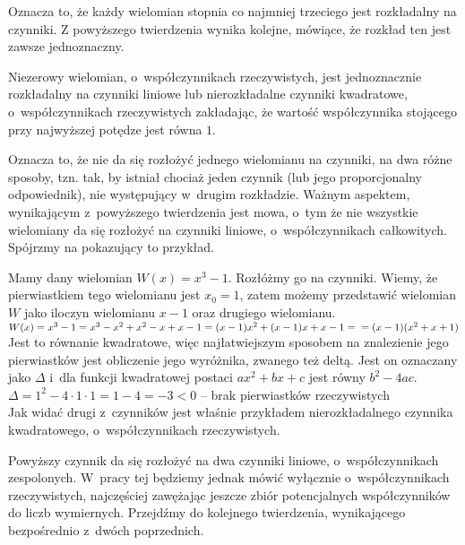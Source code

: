 Oznacza to, że każdy wielomian stopnia co najmniej trzeciego jest rozkładalny na czynniki. Z powyższego twierdzenia wynika kolejne, mówiące, że rozkład ten jest zawsze jednoznaczny.

\begin{theorem}
	$ $\\
	Niezerowy wielomian, o~współczynnikach rzeczywistych, jest jednoznacznie rozkładalny na czynniki liniowe lub nierozkładalne czynniki kwadratowe, o~współczynnikach rzeczywistych zakładając, że wartość współczynnika stojącego przy najwyższej potędze jest równa $1$.
\end{theorem}

Oznacza to, że nie da się rozłożyć jednego wielomianu na czynniki, na dwa różne sposoby, tzn. tak, by istniał chociaż jeden czynnik (lub jego proporcjonalny odpowiednik), nie występujący w~drugim rozkładzie. Ważnym aspektem, wynikającym z~powyższego twierdzenia jest mowa, o~tym że nie wszystkie wielomiany da się rozłożyć na czynniki liniowe, o~współczynnikach całkowitych. Spójrzmy na pokazujący to przykład.

\begin{example}
	$ $\\
	Mamy dany wielomian $W(x)=x^3-1$. Rozłóżmy go na czynniki.
	Wiemy, że pierwiastkiem tego wielomianu jest $x_0 = 1$, zatem możemy przedstawić wielomian $W$ jako iloczyn wielomianu $x-1$ oraz drugiego wielomianu. \\
	$W(x)=x^3-1=x^3-x^2+x^2-x+x-1=(x-1)x^2+(x-1)x+x-1 = \\
	=(x-1)(x^2+x+1)$ \\
	Jest to równanie kwadratowe, więc najłatwiejszym sposobem na znalezienie jego pierwiastków jest obliczenie jego wyróżnika, zwanego też deltą. Jest on oznaczany jako $\Delta$ i~dla funkcji kwadratowej postaci $ax^2+bx+c$ jest równy $b^2-4ac$. \\
	$\Delta = 1^2 - 4 \cdot 1 \cdot 1 = 1 - 4 = -3 < 0$ -- brak pierwiastków rzeczywistych\\
	Jak widać drugi z~czynników jest właśnie przykładem nierozkładalnego czynnika kwadratowego, o~współczynnikach rzeczywistych.
\end{example}

Powyższy czynnik da się rozłożyć na dwa czynniki liniowe, o~współczynnikach zespolonych. W~pracy tej będziemy jednak mówić wyłącznie o~współczynnikach rzeczywistych, najczęściej zawężając jeszcze zbiór potencjalnych współczynników do liczb wymiernych. Przejdźmy do kolejnego twierdzenia, wynikającego bezpośrednio z~dwóch poprzednich.

